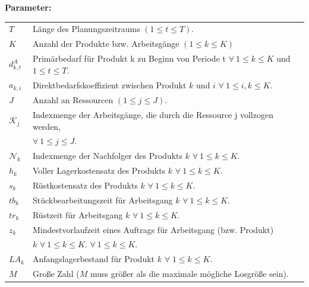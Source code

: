 \documentclass[13pt,a4paper, listof=entryprefix, bibliography=totocnumbered,toc=listofnumbered,lof=listofnumbered]{scrartcl}
\begin{document}
\textbf{Parameter:}
\begin{tabularx}{\linewidth}{@{}p{1cm}X}
	$T$               & Länge des Planungszeitraums $(1 \le t \le T)$.                                                   \\
	$K$               & Anzahl der Produkte bzw. Arbeitsgänge $(1 \le k \le K)$                                          \\
	$d^{A}_{k,t}$     & Primärbedarf für Produkt k zu Beginn von Periode t $\forall~ 1 \le k \le K$ und $1 \le t \le T$. \\
	$a_{k,i}$         & Direktbedarfskoeffizient zwischen Produkt $k$ und $i$ $\forall~ 1 \le i, k \le K$.               \\
	$J$               & Anzahl an Ressourcen $(1 \le j \le J)$.                                                          \\
	$\mathcal{K}_{j}$ & Indexmenge der Arbeitsgänge, die durch die Ressource j vollzogen werden,                         \\
	                  & $\forall ~1 \le j \le J$.                                                                        \\
	$\mathcal{N}_{k}$ & Indexmenge der Nachfolger des Produkts $k$ $\forall ~ 1 \le k \le K$.                            \\
	$h_k$             & Voller Lagerkostensatz des Produkts $k$ $\forall~ 1 \le k \le K$.                                \\
	$s_k$             & Rüstkostensatz des Produkts $k$ $\forall~ 1 \le k \le K$.                                        \\
	$tb_k$            & Stückbearbeitungszeit für Arbeitsgang $k$ $\forall~ 1 \le k \le K$.                              \\
	$tr_k$            & Rüstzeit für Arbeitsgang $k$ $\forall~ 1 \le k \le K$.                                           \\
	$z_k$             & Mindestvorlaufzeit eines Auftrags für Arbeitsgang (bzw. Produkt)                                 \\
	                  & $k$ $\forall~ 1 \le k \le K$. $\forall~ 1 \le k \le K$.                                          \\
	$LA_{k}$          & Anfangslagerbestand für Produkt $k$ $\forall\; 1 \le k \le K$.                                   \\
	$M$               & Große Zahl ($M$ muss größer als die maximale mögliche Losgröße sein).                            \\
\end{tabularx}
\addtocounter{table}{-1} %
\end{document}
